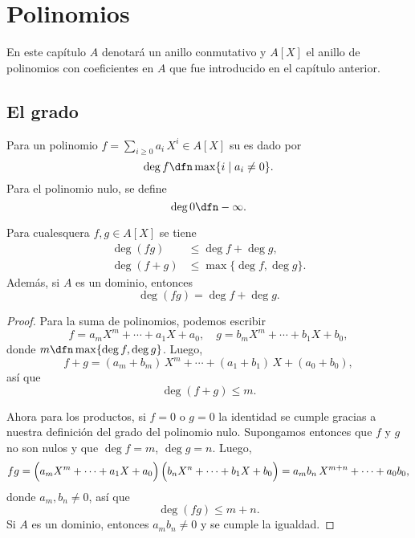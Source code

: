 \chapter{Polinomios}

\ifdefined\separatechapter\bookbanner\fi

En este capítulo $A$ denotará un anillo conmutativo y $A [X]$ el anillo de
polinomios con coeficientes en $A$ que fue introducido en el capítulo anterior.


\section{El grado}

\begin{definicion}
  Para un polinomio $f = \sum_{i\ge 0} a_i\,X^i \in A [X]$ su  es
  dado por
  $$\deg f \dfn \max \{ i \mid a_i \ne 0 \}.$$
  Para el polinomio nulo, se define
  $$\deg 0 \dfn -\infty.$$
\end{definicion}

\begin{proposicion}
  \label{propn:grado-de-producto-de-polinomios}
  Para cualesquera $f, g\in A [X]$ se tiene
  \begin{align*}
    \deg (fg) & \le \deg f + \deg g,\\
    \deg (f + g) & \le \max \{ \deg f, \deg g \}.
  \end{align*}
  Además, si $A$ es un dominio, entonces
  \begin{equation}
    \label{eqn:grado-de-producto-de-polinomios}
    \deg (fg) = \deg f + \deg g.
  \end{equation}

  \begin{proof}
    Para la suma de polinomios, podemos escribir
    $$f = a_m X^m + \cdots + a_1 X + a_0, \quad g = b_m X^m + \cdots + b_1 X + b_0,$$
    donde $m \dfn \max \{ \deg f, \deg g \}$. Luego,
    $$f + g = (a_m+b_m)\,X^m + \cdots + (a_1+b_1)\,X + (a_0+b_0),$$
    así que
    $$\deg (f + g) \le m.$$

    Ahora para los productos, si $f = 0$ o $g = 0$ la identidad
     se cumple gracias a nuestra
    definición del grado del polinomio nulo. Supongamos entonces que $f$ y $g$
    no son nulos y que $\deg f = m$, $\deg g = n$. Luego,
    $$fg = \Bigl(a_m X^m + \cdots + a_1 X + a_0\Bigr)\,\Bigl(b_n X^n + \cdots + b_1 X + b_0\Bigr) = a_m b_n \, X^{m+n} + \cdots + a_0 b_0,$$
    donde $a_m, b_n \ne 0$, así que
    $$\deg (fg) \le m+n.$$
    Si $A$ es un dominio, entonces $a_m b_n \ne 0$ y se cumple la igualdad.
  \end{proof}
\end{proposicion}

